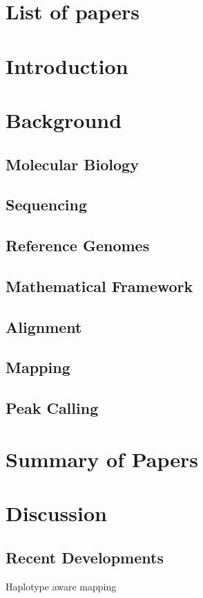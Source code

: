 \chapter{List of papers}
\chapter{Introduction}

\chapter{Background}
\section{Molecular Biology}

\section{Sequencing}

\section{Reference Genomes}

\section{Mathematical Framework}

\section{Alignment}

\section{Mapping}

\clearpage
\section{Peak Calling}

\chapter{Summary of Papers}
\chapter{Discussion}

\section{Recent Developments}
Haplotype aware mapping

% 
% 
% 
% 
% 
% 
% 

